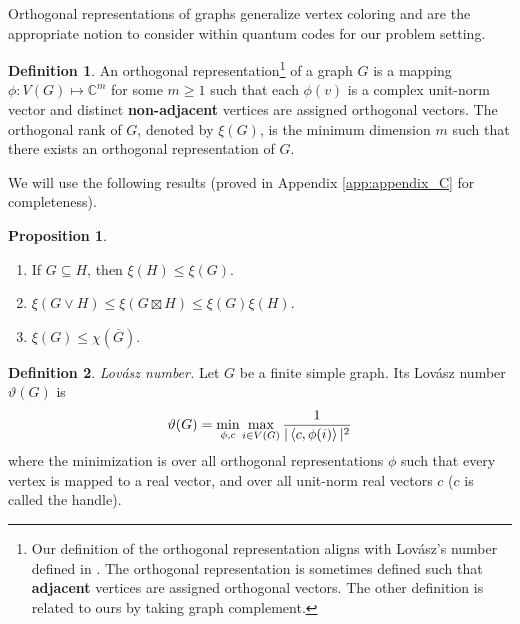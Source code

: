 \documentclass[journal, onecolumn, draftcls]{IEEEtran}
\theoremstyle{definition}
\newtheorem{proposition}{Proposition}
\newtheorem{definition}{Definition}
\newcommand{\calL}{\mathcal{L}}
\newcommand{\bbC}{\mathbb{C}}
\newcommand{\bbR}{\mathbb{R}}
\newcommand{\meng}[1]{\marginpar{+}{\bf Ruoyu's remark}: {\em #1}}
\newcommand{\aditya}[1]{\marginpar{+}{\bf Aditya's remark}: {\em #1}}
\begin{document}
Orthogonal representations of graphs generalize  vertex coloring and are the appropriate notion to consider within quantum codes for our problem setting.

 

 

\begin{definition}
An orthogonal representation\footnote{
Our definition of the orthogonal representation aligns with Lov\'asz's number defined in \cite{lovasz1979shannon}.  
The orthogonal representation is sometimes defined such that  \textbf{adjacent} vertices are assigned orthogonal vectors. The other definition is related to ours by taking graph complement. }
of a graph $G$ is a mapping $\phi:V(G)\mapsto \bbC^m$ for some $m\ge 1$ such that  each $\phi(v)$ is a complex unit-norm vector and distinct \textbf{non-adjacent}  vertices are assigned orthogonal vectors. The orthogonal rank of $G$, denoted by $\xi(G)$, is the minimum dimension $m$ such that  there exists an orthogonal representation of $G$.
\end{definition}  
We will use the following results (proved in Appendix \ref{app:appendix_C} for completeness).
\begin{proposition}\label{prop:xi}
\begin{enumerate}[label=(\alph*)]
    \item 
\label{prop:subgraph_xi}
If $G\subseteq H$, then $\xi(H)\le \xi(G)$.
\item \label{prop:xi_product}
$\xi(G\lor   H)\le  \xi(G\boxtimes  H)\le \xi(G)\xi(H)$.
\item \label{prop:xi_chi_compare}
$\xi(G)\le \chi(\overline{G})$. \label{prop:quan_less_than_class}
\end{enumerate} 
\end{proposition} 

 



 
 

\begin{definition}{\it Lov\'asz number.} 
Let $G$ be     a finite simple graph. Its Lov\'asz number $\vartheta(G)$ \cite{lovasz1979shannon} is
$$
\vartheta(G) = \min_{\phi,c}\max_{i\in V(G)}\frac{1}{|\braket{c, \phi(i)}|^2}
$$
where the minimization is over all orthogonal representations $\phi$ such that every vertex is mapped to a real vector, and over all unit-norm real vectors $c$ ($c$ is called the handle).
\end{definition}  
\end{document}
